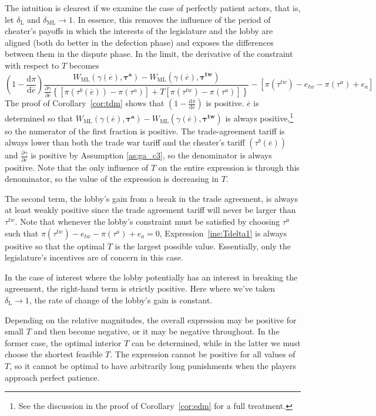 \documentclass[authoryear, review]{elsarticle}
\newcommand{\ov}{\overline}
\newcommand{\bta}{\bm{\tau^a}}
\newcommand{\ga}{\gamma}
\newcommand{\btw}{\bm{\tau^{tw}}}
\newcommand{\de}{\delta}
\begin{document}
The intuition is clearest if we examine the case of perfectly patient actors, that is, let $\de_\text{L}$ and $\de_\text{ML} \rightarrow 1$. In essence, this removes the influence of the period of cheater's payoffs in which the interests of the legislature and the lobby are aligned (both do better in the defection phase) and exposes the differences between them in the dispute phase. In the limit, the derivative of the constraint with respect to $T$ becomes
\begin{equation}
  \left(1 - \frac{\mathrm{d} \pi}{\mathrm{d} \ov{e}} \right) \frac{ W_\text{ML}(\ga(\ov{e}),\bta) - W_\text{ML}(\ga(\ov{e}),\btw) }{\frac{\partial \ga}{\partial e} \left\{
  \left[ \pi(\tau^b(\ov{e})) - \pi(\tau^a) \right] + T \left[ \pi(\tau^{tw}) - \pi(\tau^a) \right]\right\}} - \left[ \pi(\tau^{tw}) - e_{tw} -\pi(\tau^a) + e_a \right]
 	\label{ine:Tdelta1}
\end{equation}
The proof of Corollary~\ref{cor:tdm} shows that $\left(1 - \frac{\mathrm{d} \pi}{\mathrm{d} \ov{e}} \right)$ is positive. $\ov{e}$ is determined so that $W_\text{ML}(\ga(\ov{e}),\bta) - W_\text{ML}(\ga(\ov{e}),\btw)$ is always positive,\footnote{See the discussion in the proof of Corollary~\ref{cor:edm} for a full treatment.} so the numerator of the first fraction is positive. The trade-agreement tariff is always lower than both the trade war tariff and the cheater's tariff $\left(\tau^b\left(\ov{e}\right)\right)$ and $\frac{\partial \ga}{\partial e}$ is positive by Assumption \ref{as:ga_c3}, so the denominator is always positive. Note that the only influence of $T$ on the entire expression is through this denominator, so the value of the expression is decreasing in $T$.

The second term, the lobby's gain from a break in the trade agreement, is always at least weakly positive since the trade agreement tariff will never be larger than $\tau^{tw}$. Note that whenever the lobby's constraint must be satisfied by choosing $\tau^a$ such that $\pi(\tau^{tw}) - e_{tw} -\pi(\tau^a) + e_a =0$, Expression~\ref{ine:Tdelta1} is always positive so that the optimal $T$ is the largest possible value. Essentially, only the legislature's incentives are of concern in this case.

In the case of interest where the lobby potentially has an interest in breaking the agreement, the right-hand term is strictly positive. Here where we've taken $\de_\text{L} \rightarrow 1$, the rate of change of the lobby's gain is constant.

Depending on the relative magnitudes, the overall expression may be positive for small $T$ and then become negative, or it may be negative throughout. In the former case, the optimal interior $T$ can be determined, while in the latter we must choose the shortest feasible $T$. The expression cannot be positive for all values of $T$, so it cannot be optimal to have arbitrarily long punishments when the players approach perfect patience.
\end{document}
